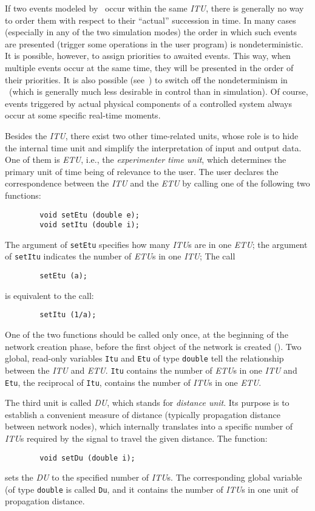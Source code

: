 If two events modeled by \smurph\ occur within the same {\em ITU}, there
is generally
no way to order them with respect to their ``actual'' succession in time.
In many cases (especially in any of the two simulation modes)
the order in which such events are presented (trigger some
operations in the user program) is nondeterministic.
It is possible, however, to assign priorities to awaited events.
This way, when multiple events occur at the same time, they will be
presented in the order of their priorities.
It is also possible (see~) to switch off the nondeterminism
in \smurph\ (which is generally much less desirable in control than in
simulation).
Of course, events triggered by actual physical components of a controlled
system always occur at some specific real-time moments.

Besides the {\em ITU}, there exist two other time-related units, whose role
is to hide the internal time unit and simplify the interpretation of input
and output data.
One of them is {\em ETU}, i.e., the
{\em experimenter time unit}, which determines the primary unit of time being of
relevance to the user.
The user declares the correspondence between the {\em ITU\/} and the {\em ETU\/}
by calling one of the following two functions:
\begin{verbatim}
        void setEtu (double e);
        void setItu (double i);
\end{verbatim}
The argument of {\tt setEtu}
specifies how many {\em ITU\/}s are in one {\em ETU};
the argument of {\tt setItu}
indicates the number of {\em ETU\/}s in one {\em ITU};
The call
\begin{verbatim}
        setEtu (a);
\end{verbatim}
is equivalent to the call:
\begin{verbatim}
        setItu (1/a);
\end{verbatim}
One of the two functions
should be called only once, at the beginning of the network
creation phase, before the first object of the network is created
().
Two global, read-only variables {\tt Itu} and {\tt Etu} of type {\tt double}
tell the relationship between the {\em ITU\/} and {\em ETU}.
{\tt Itu} contains the number of {\em ETU\/}s in one {\em ITU\/} and
{\tt Etu}, the reciprocal of {\tt Itu}, contains the number of {\em ITU\/}s
in one {\em ETU}.

The third unit is called {\em DU}, which stands for {\em distance unit}.
Its purpose is to establish a convenient measure of distance (typically
propagation distance between network nodes), which internally translates into
a specific number of {\em ITU\/}s required by the signal to travel the given
distance.
The function:
\begin{verbatim}
        void setDu (double i);
\end{verbatim}
sets the {\em DU\/} to the specified number of {\em ITU\/}s.
The corresponding global variable (of type {\tt double} is called {\tt Du},
and it contains the number of {\em ITU\/}s in one unit of propagation
distance.

